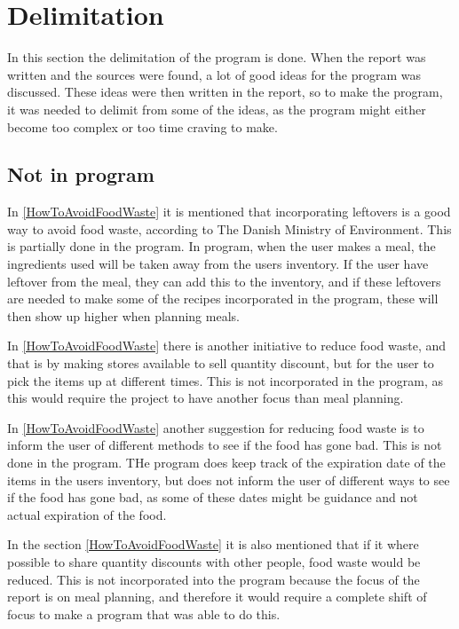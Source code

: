 \section{Delimitation}

In this section the delimitation of the program is done. When the report was written and the sources were found, a lot of good ideas for the program was discussed. These ideas were then written in the report, so to make the program, it was needed to delimit from some of the ideas, as the program might either become too complex or too time craving to make.

\subsection{Not in program}

In \cref{HowToAvoidFoodWaste} it is mentioned that incorporating leftovers is a good way to avoid food waste, according to The Danish Ministry of Environment. This is partially done in the program. In program, when the user makes a meal, the ingredients used will be taken away from the users inventory. If the user have leftover from the meal, they can add this to the inventory, and if these leftovers are needed to make some of the recipes incorporated in the program, these will then show up higher when planning meals.

In \cref{HowToAvoidFoodWaste} there is another initiative to reduce food waste, and that is by making stores available to sell quantity discount, but for the user to pick the items up at different times. This is not incorporated in the program, as this would require the project to have another focus than meal planning.

In \cref{HowToAvoidFoodWaste} another suggestion for reducing food waste is to inform the user of different methods to see if the food has gone bad. This is not done in the program. THe program does keep track of the expiration date of the items in the users inventory, but does not inform the user of different ways to see if the food has gone bad, as some of these dates might be guidance and not actual expiration of the food.

In the section \ref{HowToAvoidFoodWaste} it is also mentioned that if it where possible to share quantity discounts with other people, food waste would be reduced. This is not incorporated into the program because the focus of the report is on meal planning, and therefore it would require a complete shift of focus to make a program that was able to do this.

